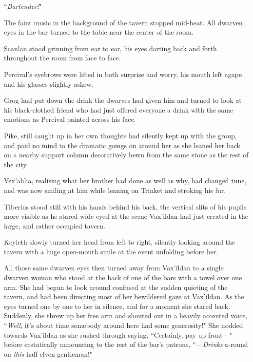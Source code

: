 \begin{center}
    ``\textit{Bartender!}"
\end{center}

The faint music in the background of the tavern stopped mid-beat. All dwarven eyes in the bar turned to the table near the center of the room.

Scanlan stood grinning from ear to ear, his eyes darting back and forth throughout the room from face to face.

Percival's eyebrows were lifted in both surprise and worry, his mouth left agape and his glasses slightly askew.

Grog had put down the drink the dwarves had given him and turned to look at his black-clothed friend who had just offered everyone a drink with the same emotions as Percival painted across his face.

Pike, still caught up in her own thoughts had silently kept up with the group, and paid no mind to the dramatic goings on around her as she leaned her back on a nearby support column decoratively hewn from the same stone as the rest of the city.

Vex'ahlia, realising what her brother had done as well as why, had changed tune, and was now smiling at him while leaning on Trinket and stroking his fur.

Tiberius stood still with his hands behind his back, the vertical slits of his pupils more visible as he stared wide-eyed at the scene Vax'ildan had just created in the large, and rather occupied tavern.

Keyleth slowly turned her head from left to right, silently looking around the tavern with a huge open-mouth smile at the event unfolding before her.

All those same dwarven eyes then turned away from Vax'ildan to a single dwarven woman who stood at the back of one of the bars with a towel over one arm. She had begun to look around confused at the sudden quieting of the tavern, and had been directing most of her bewildered gaze at Vax'ildan. As the eyes turned one by one to her in silence, and for a moment she stared back. Suddenly, she threw up her free arm and shouted out in a heavily accented voice, ``\textit{Well}, it's about time somebody around here had some generosity!" She nodded towards Vax'ildan as she rushed through saying, ``Certainly, pay up front---" before ecstatically announcing to the rest of the bar's patrons, ``---\textit{Drinks} a-round on \textit{this} half-elven gentleman!"

